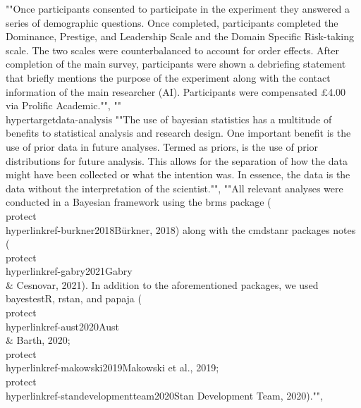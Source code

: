 {{{{{{{{{{{{""Once participants consented to participate in the experiment they answered a series of demographic questions. Once completed, participants completed the Dominance, Prestige, and Leadership Scale and the Domain Specific Risk-taking scale. The two scales were counterbalanced to account for order effects. After completion of the main survey, participants were shown a debriefing statement that briefly mentions the purpose of the experiment along with the contact information of the main researcher (AI). Participants were compensated £4.00 via Prolific Academic."", 
""\\hypertarget{data-analysis}{%
""The use of bayesian statistics has a multitude of benefits to statistical analysis and research design. One important benefit is the use of prior data in future analyses. Termed as priors, is the use of prior distributions for future analysis. This allows for the separation of how the data might have been collected or what the intention was. In essence, the data is the data without the interpretation of the scientist."", ""All relevant analyses were conducted in a Bayesian framework using the brms package (\\protect\\hyperlink{ref-burkner2018}{Bürkner, 2018}) along with the cmdstanr packages notes (\\protect\\hyperlink{ref-gabry2021}{Gabry \\& Cesnovar, 2021}). In addition to the aforementioned packages, we used bayestestR, rstan, and papaja (\\protect\\hyperlink{ref-aust2020}{Aust \\& Barth, 2020}; \\protect\\hyperlink{ref-makowski2019}{Makowski et al., 2019}; \\protect\\hyperlink{ref-standevelopmentteam2020}{Stan Development Team, 2020})."", 
}}}}}}}}}}}}}
